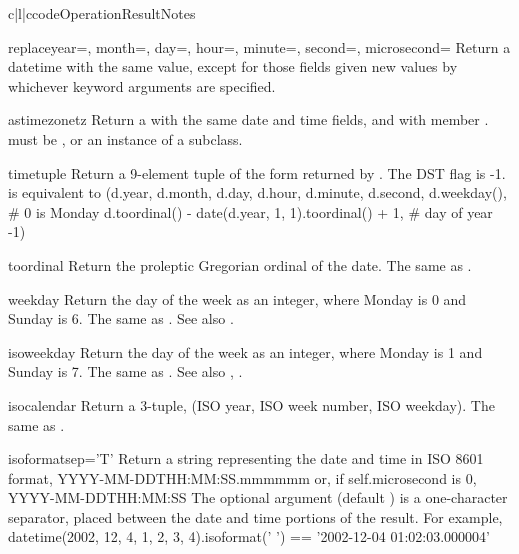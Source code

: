 \begin{tableiii}{c|l|c}{code}{Operation}{Result}{Notes}
\begin{methoddesc}{replace}{year=, month=, day=, hour=, minute=, second=, microsecond=}
    Return a datetime with the same value, except for those fields given
    new values by whichever keyword arguments are specified.
\end{methoddesc}

\begin{methoddesc}{astimezone}{tz}
    Return a  with the same date and time fields, and
    with  member .   must be ,
    or an instance of a  subclass.
\end{methoddesc}

\begin{methoddesc}{timetuple}{}
    Return a 9-element tuple of the form returned by
    .
    The DST flag is -1.    is equivalent to
        (d.year, d.month, d.day,
         d.hour, d.minute, d.second,
         d.weekday(),  \# 0 is Monday
         d.toordinal() - date(d.year, 1, 1).toordinal() + 1, \# day of year
         -1)
\end{methoddesc}

\begin{methoddesc}{toordinal}{}
    Return the proleptic Gregorian ordinal of the date.  The same as
    .
\end{methoddesc}

\begin{methoddesc}{weekday}{}
    Return the day of the week as an integer, where Monday is 0 and
    Sunday is 6.  The same as .
    See also .
\end{methoddesc}

\begin{methoddesc}{isoweekday}{}
    Return the day of the week as an integer, where Monday is 1 and
    Sunday is 7.  The same as .
    See also , .
\end{methoddesc}

\begin{methoddesc}{isocalendar}{}
    Return a 3-tuple, (ISO year, ISO week number, ISO weekday).  The
    same as .
\end{methoddesc}

\begin{methoddesc}{isoformat}{sep='T'}
    Return a string representing the date and time in ISO 8601 format,
        YYYY-MM-DDTHH:MM:SS.mmmmmm
    or, if self.microsecond is 0,
        YYYY-MM-DDTHH:MM:SS
    The optional argument  (default ) is a
    one-character separator, placed between the date and time portions
    of the result.  For example,
        datetime(2002, 12, 4, 1, 2, 3, 4).isoformat(' ') ==
        '2002-12-04 01:02:03.000004'
\end{methoddesc}


\end{tableiii}
